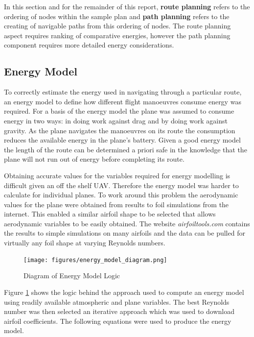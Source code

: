 \documentclass[a4paper,12pt,twoside]{article}
\begin{document}
In this section and for the remainder of this report, \textbf{route planning} refers to the ordering of nodes within the sample plan and \textbf{path planning} refers to the creating of navigable paths from this ordering of nodes. The route planning aspect requires ranking of comparative energies, however the path planning component requires more detailed energy considerations.

\subsection{Energy Model}
\label{sec:energy_model}

To correctly estimate the energy used in navigating through a particular route, an energy model to define how different flight manoeuvres consume energy was required. For a basis of the energy model the plane was assumed to consume energy in two ways: in doing work against drag and by doing work against gravity. As the plane navigates the manoeuvres on its route the consumption reduces the available energy in the plane's battery. Given a good energy model the length of the route can be determined a priori safe in the knowledge that the plane will not run out of energy before completing its route.

Obtaining accurate values for the variables required for energy modelling is difficult given an off the shelf UAV. Therefore the energy model was harder to calculate for individual planes. To work around this problem the aerodynamic values for the plane were obtained from results to foil simulations from the internet. This enabled a similar airfoil shape to be selected that allows aerodynamic variables to be easily obtained. The website \textit{airfoiltools.com} contains the results to simple simulations on many airfoils and the data can be pulled for virtually any foil shape at varying Reynolds numbers.

\begin{figure}
\centering
\texttt{[image: figures/energy\_model\_diagram.png]} 
\caption{Diagram of Energy Model Logic}
\label{fig:energy_model_diagram}
\end{figure}

Figure \ref{fig:energy_model_diagram} shows the logic behind the approach used to compute an energy model using readily available atmospheric and plane variables. The best Reynolds number was then selected an iterative approach which was used to download airfoil coefficients. The following equations were used to produce the energy model.
\end{document}

